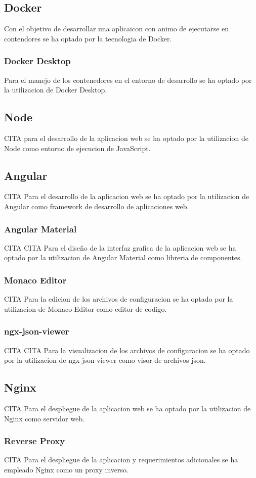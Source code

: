 \documentclass[12pt, a4paper, twoside]{article}
\begin{document}
\subsection{Docker}
Con el objetivo de desarrollar una aplicaicon con animo de ejecutarse en contendores se ha optado por la tecnologia de Docker.
\subsubsection{Docker Desktop}
Para el manejo de los contenedores en el entorno de desarrollo se ha optado por la utilizacion de Docker Desktop.

\subsection{Node}
CITA
para el desarrollo de la aplicacion web se ha optado por la utilizacion de Node como entorno de ejecucion de JavaScript.
\subsection{Angular}
CITA
Para el desarrollo de la aplicacion web se ha optado por la utilizacion de Angular como framework de desarrollo de aplicaciones web.
\subsubsection{Angular Material}
CITA
CITA Para el diseño de la interfaz grafica de la aplicacion web se ha optado por la utilizacion de Angular Material como libreria de componentes.
\subsubsection{Monaco Editor}
CITA Para la edicion de los archivos de configuracion se ha optado por la utilizacion de Monaco Editor como editor de codigo.
\subsubsection{ngx-json-viewer}
CITA
CITA Para la visualizacion de los archivos de configuracion se ha optado por la utilizacion de ngx-json-viewer como visor de archivos json.

\subsection{Nginx}
CITA
Para el despliegue de la aplicacion web se ha optado por la utilizacion de Nginx como servidor web.
\subsubsection{Reverse Proxy}
CITA
Para el despliegue de la aplicacion y requerimientos adicionales se ha empleado Nginx como un proxy inverso.
\end{document}
